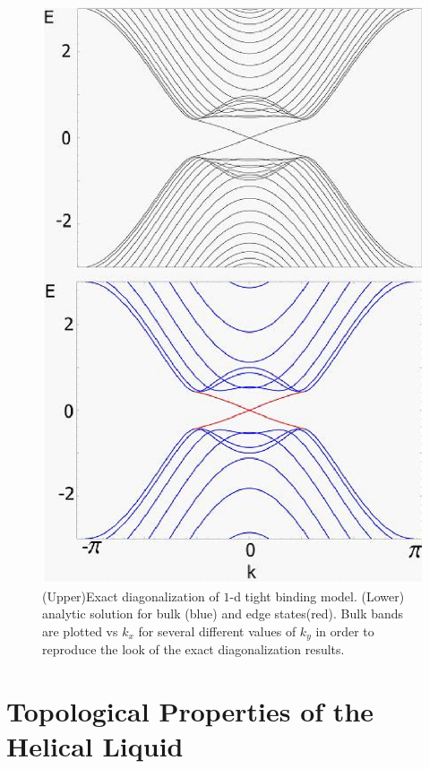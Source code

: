 \documentclass{article}
\begin{document}
\begin{figure}[h]
\centering
\includegraphics[scale=0.50]{80608Fig03.eps}
\caption{(Upper)Exact diagonalization of $1$-d tight binding model.
(Lower) analytic solution for bulk (blue) and edge states(red). Bulk
bands are plotted vs $k_x$ for several different values of $k_y$ in
order to reproduce the look of the exact diagonalization results. }
\label{edgecomb}
\end{figure}


\section{Topological Properties of the Helical Liquid}
\end{document}
